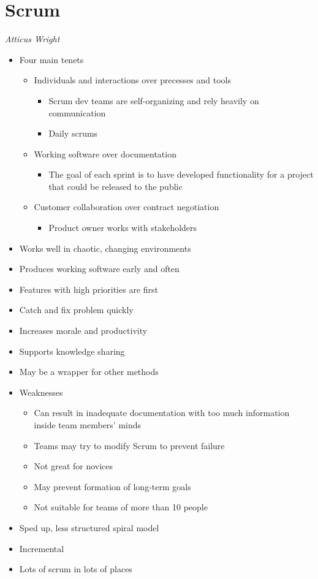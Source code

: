 \documentclass{report}
\begin{document}
		\section{Scrum}
			\textit{Atticus Wright}
			\begin{itemize}
				\item Four main tenets
					\begin{itemize}
						\item Individuals and interactions over precesses and tools
							\begin{itemize}
								\item Scrum dev teams are self-organizing and rely heavily on communication
								\item Daily scrums
							\end{itemize}
						\item Working software over documentation
							\begin{itemize}
								\item The goal of each sprint is to have developed functionality for a project that could be released to the public
							\end{itemize}
						\item Customer collaboration over contract negotiation
							\begin{itemize}
								\item Product owner works with stakeholders
							\end{itemize}
					\end{itemize}
				\item Works well in chaotic, changing environments
				\item Produces working software early and often
				\item Features with high priorities are first
				\item Catch and fix problem quickly
				\item Increases morale and productivity
				\item Supports knowledge sharing
				\item May be a wrapper for other methods
				\\
				\item Weaknesses
					\begin{itemize}
						\item Can result in inadequate documentation with too much information inside team members' minds
						\item Teams may try to modify Scrum to prevent failure
						\item Not great for novices
						\item May prevent formation of long-term goals
						\item Not suitable for teams of more than 10 people
					\end{itemize}
				\item Sped up, less structured spiral model
				\item Incremental
				\item Lots of scrum in lots of places
			\end{itemize}
\end{document}
